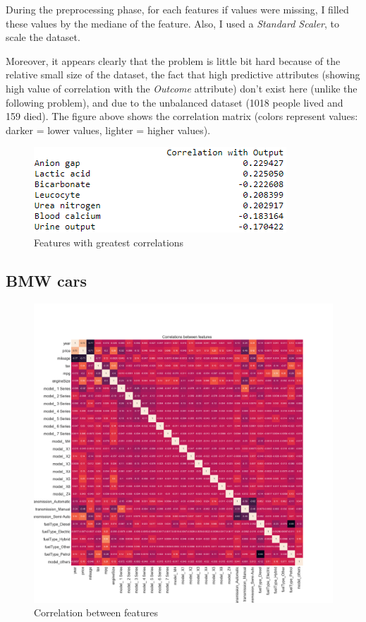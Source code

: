 \documentclass[15pt]{article}
\begin{document}
\begin{multicols}{2}
During the preprocessing phase, for each features if values were missing, I filled these values by the mediane of the feature. Also, I used a \textit{Standard Scaler}, to scale the dataset.

Moreover, it appears clearly that the problem is little bit hard because of the relative small size of the dataset, the fact that high predictive attributes (showing high value of correlation with the \textit{Outcome} attribute) don't exist here (unlike the following problem), and due to the unbalanced dataset (1018 people lived and 159 died). The figure above shows the correlation matrix (colors represent values: darker = lower values, lighter = higher values).

\begin{figure}[H]
\centering
\includegraphics[width = \columnwidth]{Capture.png}
\caption{Features with greatest correlations}
\end{figure}

\subsection{BMW cars}

\begin{figure}[H]
\centering
\includegraphics[width = \columnwidth]{corrFeaturesBMW.png}
\caption{Correlation between features}
\end{figure}


\end{multicols}
\end{document}
